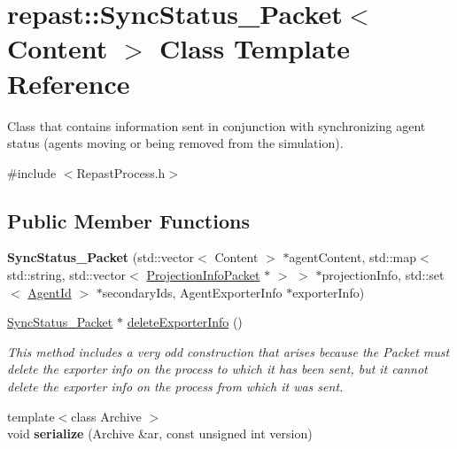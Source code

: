 \hypertarget{classrepast_1_1_sync_status___packet}{\section{repast\-:\-:Sync\-Status\-\_\-\-Packet$<$ Content $>$ Class Template Reference}
\label{classrepast_1_1_sync_status___packet}
}


Class that contains information sent in conjunction with synchronizing agent status (agents moving or being removed from the simulation).  




{\ttfamily \#include $<$Repast\-Process.\-h$>$}

\subsection*{Public Member Functions}
\begin{DoxyCompactItemize}
\item 
\hypertarget{classrepast_1_1_sync_status___packet_af2794c729bc9d7c9c969bd8e1429ed3c}{{\bfseries Sync\-Status\-\_\-\-Packet} (std\-::vector$<$ Content $>$ $\ast$agent\-Content, std\-::map$<$ std\-::string, std\-::vector$<$ \hyperlink{classrepast_1_1_projection_info_packet}{Projection\-Info\-Packet} $\ast$ $>$ $>$ $\ast$projection\-Info, std\-::set$<$ \hyperlink{classrepast_1_1_agent_id}{Agent\-Id} $>$ $\ast$secondary\-Ids, Agent\-Exporter\-Info $\ast$exporter\-Info)}\label{classrepast_1_1_sync_status___packet_af2794c729bc9d7c9c969bd8e1429ed3c}

\item 
\hyperlink{classrepast_1_1_sync_status___packet}{Sync\-Status\-\_\-\-Packet} $\ast$ \hyperlink{classrepast_1_1_sync_status___packet_a5cf55e6368d63dfd6f9b79532389aa8f}{delete\-Exporter\-Info} ()
\begin{DoxyCompactList}\small\item\em This method includes a very odd construction that arises because the Packet {\itshape must} delete the exporter info on the process to which it has been sent, but it {\itshape cannot} delete the exporter info on the process from which it was sent. \end{DoxyCompactList}\item 
\hypertarget{classrepast_1_1_sync_status___packet_aa86d232a3880460abd7ca62417bc8445}{{\footnotesize template$<$class Archive $>$ }\\void {\bfseries serialize} (Archive \&ar, const unsigned int version)}\label{classrepast_1_1_sync_status___packet_aa86d232a3880460abd7ca62417bc8445}

\end{DoxyCompactItemize}
